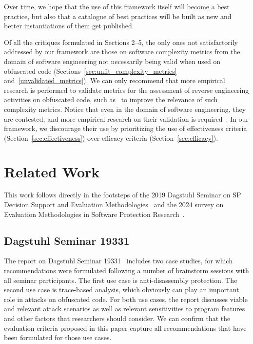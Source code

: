 Over time, we hope that the use of this framework itself will become a best practice, but also that a catalogue of best practices will be built as new and better instantiations of them get published. 

Of all the critiques formulated in Sections 2--5, the only ones not satisfactorily addressed by our framework are those on software complexity metrics from the domain of software engineering not necessarily being valid when used on obfuscated code (Sections~\ref{sec:unfit_complexity_metrics} and~\ref{unvalidated_metrics}). We can only recommend that more empirical research is performed to validate metrics for the assessment of reverse engineering activities on obfuscated code, such as~
\cite{emse2019,2014afamily} to improve the relevance of such complexity metrics. Notice that even in the domain of software engineering, they are contested, and more empirical research on their validation is required~\cite{feitelson}. In our framework, we discourage their use by prioritizing the use of effectiveness criteria (Section~\ref{sec:effectiveness}) over efficacy criteria (Section~\ref{sec:efficacy}). 

\section{Related Work}

This work follows directly in the footsteps of the 2019 Dagstuhl Seminar on SP Decision Support and Evaluation Methodologies~\cite{Dagstuhl} and the 2024 survey on Evaluation Methodologies in Software Protection Research~\cite{desutter2024evaluation}.

\subsection{Dagstuhl Seminar 19331}
The report on Dagstuhl Seminar 19331~\cite{Dagstuhl} includes two case studies, for which recommendations were formulated following a number of brainstorm sessions with all seminar participants. The first use case is anti-disassembly protection. The second use case is trace-based analysis, which obviously can play an important role in attacks on obfuscated code. For both use cases, the report discusses viable and relevant attack scenarios as well as relevant sensitivities to program features and other factors that researchers should consider. We can confirm that the evaluation criteria proposed in this paper capture all recommendations that have been formulated for those use cases. 

